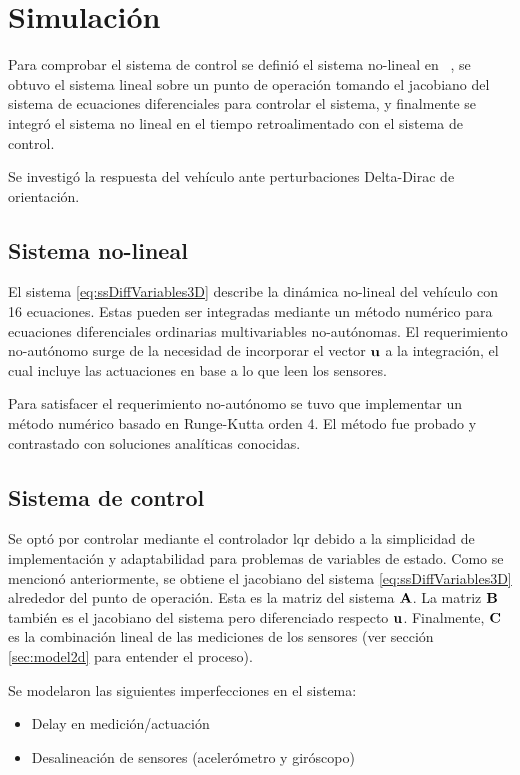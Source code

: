 \section{Simulación}

Para comprobar el sistema de control se definió el sistema no-lineal en \Matlab~, se obtuvo el sistema lineal sobre un punto de operación tomando el jacobiano del sistema de ecuaciones diferenciales para controlar el sistema, y finalmente se integró el sistema no lineal en el tiempo retroalimentado con el sistema de control.

Se investigó la respuesta del vehículo ante perturbaciones Delta-Dirac de orientación.

\subsection{Sistema no-lineal}

El sistema \eqref{eq:ssDiffVariables3D} describe la dinámica no-lineal del vehículo con 16 ecuaciones. Estas pueden ser integradas mediante un método numérico para ecuaciones diferenciales ordinarias multivariables no-autónomas. El requerimiento no-autónomo surge de la necesidad de incorporar el vector $\mathbf{u}$ a la integración, el cual incluye las actuaciones en base a lo que leen los sensores. 

Para satisfacer el requerimiento no-autónomo se tuvo que implementar un método numérico basado en Runge-Kutta orden 4. El método fue probado y contrastado con soluciones analíticas conocidas.

\subsection{Sistema de control}

Se optó por controlar mediante el controlador \gls{lqr} debido a la simplicidad de implementación y adaptabilidad para problemas de variables de estado. Como se mencionó anteriormente, se obtiene el jacobiano del sistema \eqref{eq:ssDiffVariables3D} alrededor del punto de operación. Esta es la matriz del sistema $\mathbf{A}$. La matriz $\mathbf{B}$ también es el jacobiano del sistema pero diferenciado respecto $\mathbf{u}$. Finalmente, $\mathbf{C}$ es la combinación lineal de las mediciones de los sensores (ver sección \ref{sec:model2d} para entender el proceso). 

Se modelaron las siguientes imperfecciones en el sistema:

\begin{itemize}
    \item Delay en medición/actuación
    \item Desalineación de sensores (acelerómetro y giróscopo)
\end{itemize}

